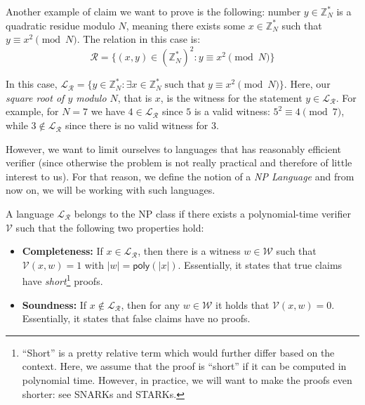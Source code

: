 \documentclass[../lecture-notes.tex]{subfiles}
\begin{document}
\begin{example}
    Another example of claim we want to prove is the following: number $y \in \mathbb{Z}_N^*$ is a quadratic residue modulo $N$, meaning there exists some $x \in \mathbb{Z}_N^*$ such that $y \equiv x^2 \pmod{N}$. The relation in this case is:
    \begin{equation*}
        \mathcal{R} = \{ (x, y) \in (\mathbb{Z}_N^*)^2: y \equiv x^2 \pmod{N} \}
    \end{equation*}

    In this case, $\mathcal{L}_{\mathcal{R}} = \{y \in \mathbb{Z}_N^*: \exists x \in \mathbb{Z}_N^* \; \text{such that} \; y \equiv x^2 \pmod{N}\}$. Here, our \textit{square root of $y$ modulo $N$}, that is $x$, is the witness for the statement $y \in \mathcal{L}_{\mathcal{R}}$. For example, for $N=7$ we have $4 \in \mathcal{L}_{\mathcal{R}}$ since $5$ is a valid witness: $5^2 \equiv 4 \pmod{7}$, while $3 \not\in \mathcal{L}_{\mathcal{R}}$ since there is no valid witness for $3$.
\end{example}


However, we want to limit ourselves to languages that has reasonably efficient verifier (since otherwise the problem is not really practical and therefore of little interest to us). For that reason, we define the notion of a \emph{NP Language} and from now on, we will be working with such languages.

\begin{definition}[NP Language]
    A language $\mathcal{L}_{\mathcal{R}}$ belongs to the NP class if there exists a polynomial-time verifier $\mathcal{V}$ such that the following two properties hold:
    \begin{itemize}
        \item \textbf{Completeness:} If $x \in \mathcal{L}_{\mathcal{R}}$, then there is a witness $w \in \mathcal{W}$ such that $\mathcal{V}(x, w) = 1$ with $|w| = \mathsf{poly}(|x|)$. Essentially, it states that true claims have \textit{short}\footnote{``Short'' is a pretty relative term which would further differ based on the context. Here, we assume that the proof is ``short'' if it can be computed in polynomial time. However, in practice, we will want to make the proofs even shorter: see SNARKs and STARKs.} proofs.
        \item \textbf{Soundness:} If $x \not\in \mathcal{L}_{\mathcal{R}}$, then for any $w \in \mathcal{W}$ it holds that $\mathcal{V}(x, w) = 0$. Essentially, it states that false claims have no proofs.
    \end{itemize}
\end{definition}
\end{document}
